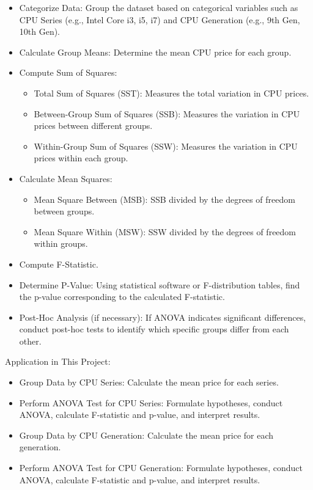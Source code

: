 \begin{itemize}
    \item Categorize Data: Group the dataset based on categorical variables such as CPU Series (e.g., Intel Core i3, i5, i7) and CPU Generation (e.g., 9th Gen, 10th Gen).
    
    \item Calculate Group Means: Determine the mean CPU price for each group.
    
    \item Compute Sum of Squares:
    \begin{itemize}
        \item Total Sum of Squares (SST): Measures the total variation in CPU prices.
        \item Between-Group Sum of Squares (SSB): Measures the variation in CPU prices between different groups.
        \item Within-Group Sum of Squares (SSW): Measures the variation in CPU prices within each group.
    \end{itemize}

    \item Calculate Mean Squares:
    \begin{itemize}
        \item Mean Square Between (MSB): SSB divided by the degrees of freedom between groups.
        \item Mean Square Within (MSW): SSW divided by the degrees of freedom within groups.
    \end{itemize}

    \item Compute F-Statistic.
     
    \item Determine P-Value: Using statistical software or F-distribution tables, find the p-value corresponding to the calculated F-statistic.
    
    \item Post-Hoc Analysis (if necessary): If ANOVA indicates significant differences, conduct post-hoc tests to identify which specific groups differ from each other.
\end{itemize}

Application in This Project:

\begin{itemize}
    \item Group Data by CPU Series: Calculate the mean price for each series.
    \item Perform ANOVA Test for CPU Series: Formulate hypotheses, conduct ANOVA, calculate F-statistic and p-value, and interpret results.
    \item Group Data by CPU Generation: Calculate the mean price for each generation.
    \item Perform ANOVA Test for CPU Generation: Formulate hypotheses, conduct ANOVA, calculate F-statistic and p-value, and interpret results.
\end{itemize}

